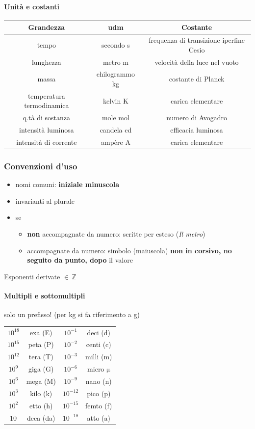 \documentclass[10pt, oneside]{book}
\begin{document}
\paragraph{Unità e costanti}
\begin{table}[h!]
\centering
\begin{tabular}{c|c|c}
\textbf{Grandezza} & \textbf{udm} & \textbf{Costante}\\\hline
tempo & secondo s & frequenza di transizione iperfine Cesio\\
lunghezza & metro m & velocità della luce nel vuoto\\
massa & chilogrammo kg & costante di Planck\\
temperatura termodinamica & kelvin K & carica elementare\\
q.tà di sostanza & mole mol & numero di Avogadro\\
intensità luminosa & candela cd & efficacia luminosa\\
intensità di corrente & ampère A & carica elementare
\end{tabular}
\end{table}

\subsubsection*{Convenzioni d'uso}
\begin{itemize}
\item nomi comuni: \textbf{iniziale minuscola}
\item invarianti al plurale
\item se
\begin{itemize}
\item \textbf{non} accompagnate da numero: scritte per esteso (\textit{Il metro})
\item accompagnate da numero: simbolo (maiuscola) \textbf{non in corsivo, no seguito da punto, dopo} il valore
\end{itemize}
\end{itemize}
Esponenti derivate $\in \, \mathbb{Z}$

\paragraph{Multipli e sottomultipli} solo un prefisso! (per kg si fa riferimento a g)
\begin{table}[h!]
\centering
\begin{tabular}{c c | c c}
$10^{18}$ & exa (E) & $10^{-1}$ & deci (d)\\
$10^{15}$ & peta (P) & $10^{-2}$ & centi (c)\\
$10^{12}$ & tera (T) & $10^{-3}$ & milli (m)\\
$10^{9}$ & giga (G) & $10^{-6}$ & micro $\mathrm{\mu}$ \\
$10^{6}$ & mega (M) & $10^{-9}$ & nano (n)\\
$10^{3}$ & kilo (k) & $10^{-12}$ & pico (p)\\
$10^{2}$ & etto (h) & $10^{-15}$ & femto (f)\\
$10^{}$ & deca (da) & $10^{-18}$ & atto (a)\\
\end{tabular}
\end{table}
\end{document}
